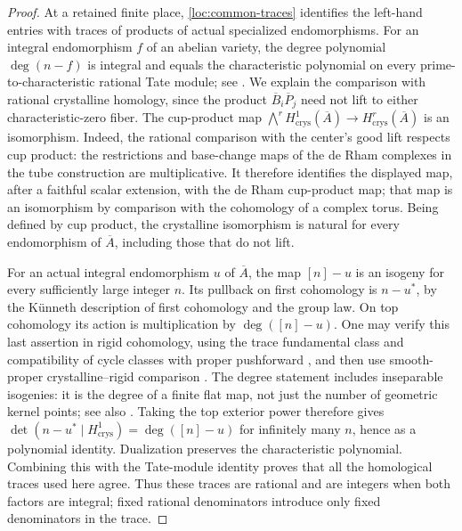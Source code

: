 \begin{proof}
At a retained finite place, \eqref{loc:common-traces} identifies the
left-hand entries with traces of products of actual specialized
endomorphisms.  For an integral endomorphism $f$ of an abelian variety,
the degree polynomial $\deg(n-f)$ is integral and equals the
characteristic polynomial on every prime-to-characteristic rational
Tate module; see
\cite[Proposition~12.9 and the preceding paragraph]{MilneAV}.
We explain the comparison with rational crystalline homology, since
the product $\overline B_i\overline P_j$ need not lift to either
characteristic-zero fiber. The cup-product map
$\bigwedge^r H^1_{\mathrm{crys}}(\overline A)\to
H^r_{\mathrm{crys}}(\overline A)$ is an isomorphism. Indeed,
the rational comparison with the center's good lift respects cup
product: the restrictions and base-change maps of the de Rham
complexes in the tube construction are multiplicative. It therefore
identifies the displayed map, after a faithful scalar extension, with the de Rham
cup-product map; that map is an isomorphism by comparison with the
cohomology of a complex torus. Being defined by cup product, the
crystalline isomorphism is natural for every endomorphism of
$\overline A$, including those that do not lift.

For an actual integral endomorphism $u$ of $\overline A$, the map
$[n]-u$ is an isogeny for every sufficiently large integer $n$.
Its pullback on first cohomology is $n-u^*$, by the K\"unneth
description of first cohomology and the group law. On top cohomology
its action is multiplication by $\deg([n]-u)$. One may verify this
last assertion in rigid cohomology, using the trace fundamental class
and compatibility of cycle classes with proper pushforward
\cite[\S2.1 and Proposition~6.4]{Petrequin2003}, and then use
smooth-proper crystalline--rigid comparison
\cite[\S1.5, Proposition~2]{Berthelot1982}. The degree statement
includes inseparable isogenies: it is the degree of a finite flat map,
not just the number of geometric kernel points; see also
\cite[Lemma~6.5]{Petrequin2003}.
Taking the top exterior power therefore gives
$\det(n-u^*\mid H^1_{\mathrm{crys}})=\deg([n]-u)$ for infinitely
many $n$, hence as a polynomial identity. Dualization preserves
the characteristic polynomial. Combining this with the Tate-module
identity proves that all the homological traces used here agree.
Thus these traces are rational and are
integers when both factors are integral; fixed rational denominators
introduce only fixed denominators in the trace.


\end{proof}
